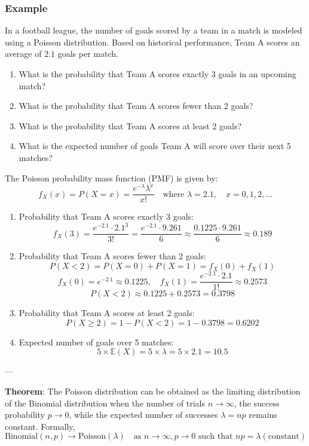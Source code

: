 \documentclass[twoside]{book}
\begin{document}
\subsubsection{Example}
In a football league, the number of goals scored by a team in a match is modeled using a Poisson distribution. Based on historical performance, Team A scores an average of $2.1$ goals per match.

\begin{enumerate}
    \item What is the probability that Team A scores exactly 3 goals in an upcoming match?
    \item What is the probability that Team A scores fewer than 2 goals?
    \item What is the probability that Team A scores at least 2 goals?
    \item What is the expected number of goals Team A will score over their next 5 matches?
\end{enumerate}

The Poisson probability mass function (PMF) is given by:
\[
f_X(x) = P(X=x)= \frac{e^{-\lambda} \lambda^x}{x!}
\quad \text{where } \lambda = 2.1, \quad x = 0, 1, 2, \dots
\]

\begin{enumerate}
    \item {Probability that Team A scores exactly 3 goals:}
    \[
    f_X(3)  = \frac{e^{-2.1} \cdot 2.1^3}{3!}
    = \frac{e^{-2.1} \cdot 9.261}{6}
    \approx \frac{0.1225 \cdot 9.261}{6}
    \approx 0.189
    \]

    \item {Probability that Team A scores fewer than 2 goals:}
    \[
    P(X < 2) = {P}(X = 0) + {P}(X = 1) = f_X(0) + f_X(1)
    \]
    \[
    f_X(0) = e^{-2.1} \approx 0.1225, \quad
    f_X(1) = \frac{e^{-2.1} \cdot 2.1}{1!} \approx 0.2573
    \]
    \[
    P(X < 2) \approx 0.1225 + 0.2573 = 0.3798
    \]

    \item {Probability that Team A scores at least 2 goals:}
    \[
    P(X \geq 2) = 1 - P(X < 2) = 1 - 0.3798 = 0.6202
    \]

    \item {Expected number of goals over 5 matches:}
    \[
    5 \times \mathbb{E}(X) = 5 \times \lambda = 5 \times 2.1 = 10.5
    \]
\end{enumerate}

---

\begin{textbox}
\textbf{Theorem}: The Poisson distribution can be obtained as the limiting distribution of the Binomial distribution when the number of trials \( n \to \infty \), the success probability \( p \to 0\), while the expected number of successes \( \lambda = np \) remains constant. Formally,
\[
\text{Binomial}(n, p) \longrightarrow \text{Poisson}(\lambda) \quad \text{as } n \to \infty, p \to 0 \text{ such that } np = \lambda (\text{constant})
\]
\end{textbox}
\end{document}
